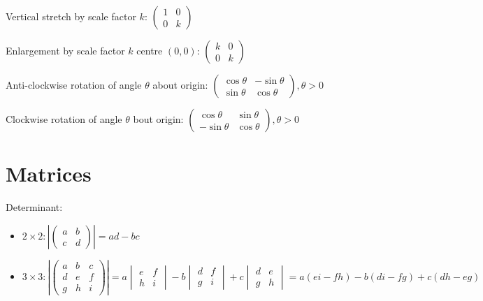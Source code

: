 \documentclass[10pt,a4paper,oneside]{book}
\begin{document}
Vertical stretch by scale factor $k$: $\begin{pmatrix}
    1 & 0\\
    0 & k 
\end{pmatrix}$

Enlargement by scale factor $k$ centre $(0,0)$: $\begin{pmatrix}
    k & 0\\
    0 & k 
\end{pmatrix}$

Anti-clockwise rotation of angle $\theta$ about origin: $\begin{pmatrix}
    \cos\theta & -\sin\theta \\ 
    \sin\theta & \cos\theta 
\end{pmatrix}, \theta > 0$

Clockwise rotation of angle $\theta$ bout origin: $\begin{pmatrix}
    \cos\theta & \sin\theta \\ 
    -\sin\theta & \cos\theta 
\end{pmatrix}, \theta>0$

\section*{Matrices}
Determinant:
\begin{itemize}
    \item $2\times 2: \left|\begin{pmatrix}
        a & b \\
        c & d
    \end{pmatrix}  \right| = ad-bc$

    \item $3\times 3: \left| 
\begin{pmatrix}
    a & b & c \\
    d & e & f \\
    g & h & i 
\end{pmatrix}
    \right| = a \begin{vmatrix}
        e & f \\ 
        h & i 
    \end{vmatrix}-b\begin{vmatrix}
        d & f \\ 
        g & i
    \end{vmatrix} +c \begin{vmatrix}
        d & e \\
        g & h
    \end{vmatrix}= a(ei-fh)-b(di-fg)+c(dh-eg)$
\end{itemize}
\end{document}
